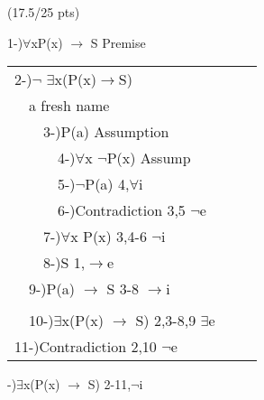 \documentclass[a4paper,12pt]{article}
\begin{document}
\hfill \small{(17.5/25 pts)}\\
\begin{tcolorbox}
1-)$\forall$xP(x) $\rightarrow$ S Premise
\newline
\begin{tabular}{|lllllllll|}
\hline
\multicolumn{9}{|l|}{2-)$\lnot$ $\exists$x(P(x)$\rightarrow$S)}                                                                                                                   \\ \cline{2-8}
\multicolumn{1}{|l|}{} & \multicolumn{7}{l|}{a fresh name}                                                                                                                     &  \\ \cline{3-7}
\multicolumn{1}{|l|}{} & \multicolumn{1}{l|}{} & \multicolumn{5}{l|}{3-)P(a) Assumption}                                                               & \multicolumn{1}{l|}{} &  \\ \cline{4-6}
\multicolumn{1}{|l|}{} & \multicolumn{1}{l|}{} & \multicolumn{1}{l|}{} & \multicolumn{3}{l|}{4-)$\forall$x $\lnot$P(x) Assump} & \multicolumn{1}{l|}{} & \multicolumn{1}{l|}{} &  \\
\multicolumn{1}{|l|}{} & \multicolumn{1}{l|}{} & \multicolumn{1}{l|}{} & \multicolumn{3}{l|}{5-)$\lnot$P(a) 4,$\forall$i}      & \multicolumn{1}{l|}{} & \multicolumn{1}{l|}{} &  \\
\multicolumn{1}{|l|}{} & \multicolumn{1}{l|}{} & \multicolumn{1}{l|}{} & \multicolumn{3}{l|}{6-)Contradiction 3,5 $\lnot$e}    & \multicolumn{1}{l|}{} & \multicolumn{1}{l|}{} &  \\ \cline{4-6}
\multicolumn{1}{|l|}{} & \multicolumn{1}{l|}{} & \multicolumn{5}{l|}{7-)$\forall$x P(x) 3,4-6 $\lnot$i}                                                & \multicolumn{1}{l|}{} &  \\
\multicolumn{1}{|l|}{} & \multicolumn{1}{l|}{} & \multicolumn{5}{l|}{8-)S 1,$\rightarrow$e}                                                            & \multicolumn{1}{l|}{} &  \\ \cline{3-7}
\multicolumn{1}{|l|}{} & \multicolumn{7}{l|}{9-)P(a) $\rightarrow$ S 3-8 $\rightarrow$i}                                                                                       &  \\
\multicolumn{1}{|l|}{} & \multicolumn{7}{l|}{}                                                                                              &  \\ \cline{2-8}
                       & \multicolumn{7}{l}{10-)$\exists$x(P(x) $\rightarrow$ S) 2,3-8,9 $\exists$e}                                                                                                   &  \\
\multicolumn{9}{|l|}{11-)Contradiction 2,10 $\lnot$e}                                                                                                           \\ \hline
\end{tabular}
-)$\exists$x(P(x) $\rightarrow$ S) 2-11,$\lnot$i
\vspace{1cm} %
\end{tcolorbox}
\end{document}
